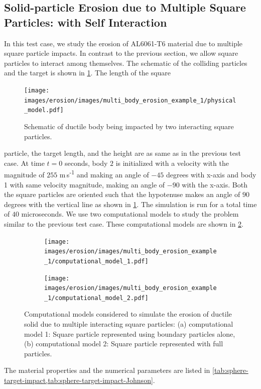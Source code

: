 \FloatBarrier%
\subsection{Solid-particle Erosion due to Multiple Square Particles: with
  Self Interaction}
\label{sec:erosion-multiple-impact-self-interact}
In this test case, we study the erosion of AL6061-T6 material due to multiple
square particle impacts. In contrast to the previous section, we allow square
particles to interact among themselves. The schematic of the colliding particles
and the target is shown in \cref{fig:mpe-1-pm}. The length of the square
\begin{figure}[!htpb]
  \centering
  \texttt{[image: images/erosion/images/multi\_body\_erosion\_example\_1/physical\_model.pdf]}
  \caption{Schematic of ductile body being impacted by two interacting square
    particles.}
\label{fig:mpe-1-pm}
\end{figure}
particle, the target length, and the height are as same as in the previous test
case. At time $t=0$ seconds, body $2$ is initialized with a velocity with the
magnitude of $255$ m\,s\textsuperscript{-1} and making an angle of $-45$ degrees
with x-axis and body 1 with same velocity magnitude, making an angle of $-90$
with the x-axis. Both the square particles are oriented such that the hypotenuse
makes an angle of $90$ degrees with the vertical line as shown in
\cref{fig:mpe-1-pm}. The simulation is run for a total time of $40$
microseconds. We use two computational models to study the problem similar to
the previous test case. These computational models are shown in
\cref{fig:mpe-1-cm}.
\begin{figure}[!htpb]
  \centering
  \begin{subfigure}{0.48\textwidth}
    \centering
    \texttt{[image: images/erosion/images/multi\_body\_erosion\_example\_1/computational\_model\_1.pdf]}
    \subcaption{}
  \end{subfigure}
  \begin{subfigure}{0.48\textwidth}
    \centering
    \texttt{[image: images/erosion/images/multi\_body\_erosion\_example\_1/computational\_model\_2.pdf]}
    \subcaption{}
  \end{subfigure}
  \caption{Computational models considered to simulate the erosion of ductile
    solid due to multiple interacting square particles: (a) computational model
    1: Square particle represented using boundary particles alone, (b)
    computational model 2: Square particle represented with full particles.}
\label{fig:mpe-1-cm}
\end{figure}
The material properties and the numerical parameters are listed in
\cref{tab:sphere-target-impact,tab:sphere-target-impact-Johnson}.


